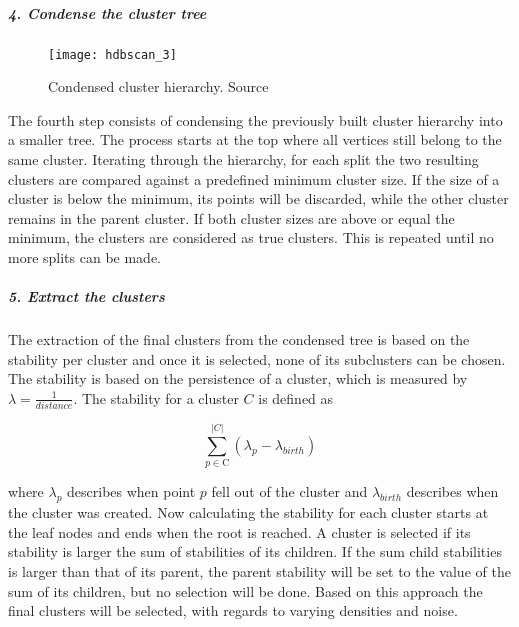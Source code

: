 \subparagraph{4. Condense the cluster tree}
\begin{figure}[h]
    \centering
    \texttt{[image: hdbscan\_3]}
    \caption{
        Condensed cluster hierarchy.
        Source\cite{how_hdbscan_works}
    }
    \label{fig:hdbscan_3}
\end{figure}

The fourth step consists of condensing the previously built cluster hierarchy into a smaller tree.
The process starts at the top where all vertices still belong to the same cluster.
Iterating through the hierarchy,
for each split the two resulting clusters are compared against a predefined minimum cluster size.
If the size of a cluster is below the minimum,
its points will be discarded, while the other cluster remains in the parent cluster.
If both cluster sizes are above or equal the minimum, the clusters are considered as true clusters.
This is repeated until no more splits can be made.

\subparagraph{5. Extract the clusters}
The extraction of the final clusters from the condensed tree is based on the stability per cluster
and once it is selected, none of its subclusters can be chosen.
The stability is based on the persistence of a cluster, which is measured by $\lambda = \frac{1}{distance}$.
The stability for a cluster $C$ is defined as

\begin{equation}
\sum_{p \in \text{C}}^{|C|} ({\lambda}_{p} - {\lambda}_{birth})
\end{equation}

where ${\lambda}_{p}$ describes when point $p$ fell out of the cluster and $ {\lambda}_{birth}$
describes when the cluster was created.
Now calculating the stability for each cluster starts at the leaf nodes and ends when the root is reached.
A cluster is selected if its stability is larger the sum of stabilities of its children.
If the sum child stabilities is larger than that of its parent,
the parent stability will be set to the value of the sum of its children,
but no selection will be done.
Based on this approach the final clusters will be selected, with regards to varying densities and noise.
